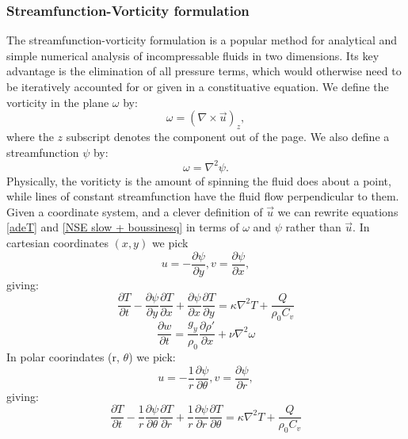 \documentclass{article}
\begin{document}
\subsubsection*{Streamfunction-Vorticity formulation}
The streamfunction-vorticity formulation is a popular method for analytical and simple numerical analysis of incompressable fluids in two dimensions. Its key advantage is the elimination of all pressure terms, which would otherwise need to be iteratively accounted for or given in a constituative equation. We define the vorticity in the plane $\omega$ by:
\begin{equation}
	\omega = (\nabla \times \vec{u})_z,
	\label{omega}
\end{equation}
where the $z$ subscript denotes the component out of the page. We also define a streamfunction $\psi$ by:
\begin{equation}
	\omega = \nabla^2 \psi.
	\label{psi}
\end{equation}
Physically, the voriticty is the amount of spinning the fluid does about a point, while lines of constant streamfunction have the fluid flow perpendicular to them. Given a coordinate system, and a clever definition of $\vec{u}$ we can rewrite 
equations \ref{adeT} and \ref{NSE slow + boussinesq} in terms of $\omega$ and $\psi$ rather than $\vec{u}$. In cartesian coordinates $(x,y)$ we pick 
\begin{equation}
	u = -\frac{\partial \psi}{\partial y}, v = \frac{\partial \psi}{\partial x},
	\label{cartesian velocities}
\end{equation}
giving:
\begin{equation}
	\frac{\partial T}{\partial t} -\frac{\partial \psi}{\partial y} \frac{\partial T}{\partial x} + \frac{\partial \psi}{\partial x} \frac{\partial T}{\partial y} = \kappa \nabla^2 T + \frac{Q}{\rho_0 C_v}
	\label{adeT sfvt cartesian}
\end{equation}
\begin{equation}
	\frac{\partial w}{\partial t} = \frac{g_y}{\rho_0} \frac{\partial \rho'}{\partial x} + \nu \nabla^2 \omega
	\label{NSE slow + boussinesq sfvt cartesian}
\end{equation}
In polar coorindates (r, $\theta$) we pick:
\begin{equation}
	u = -\frac{1}{r} \frac{\partial \psi}{\partial \theta}, v = \frac{\partial \psi}{\partial r},
	\label{polar velocities}
\end{equation}
giving:
\begin{equation}
	\frac{\partial T}{\partial t} - \frac{1}{r} \frac{\partial \psi}{\partial \theta} \frac{\partial T}{\partial r} + \frac{1}{r} \frac{\partial \psi}{\partial r} \frac{\partial T}{\partial \theta} = \kappa \nabla^2 T + \frac{Q}{\rho_0 C_v}
	\label{adeT sfvt polar}
\end{equation}
\end{document}
